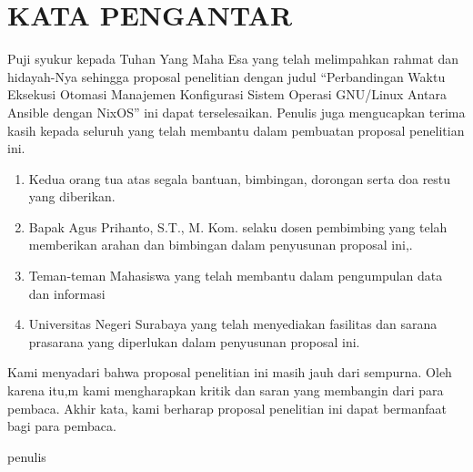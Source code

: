 \documentclass[10pt,]{report}
\begin{document}

\chapter*{KATA PENGANTAR}
  
\begin{justify}
	Puji syukur kepada Tuhan Yang Maha Esa yang telah melimpahkan rahmat dan
	hidayah-Nya sehingga proposal penelitian dengan judul “Perbandingan
	Waktu Eksekusi Otomasi Manajemen Konfigurasi Sistem Operasi GNU/Linux Antara Ansible dengan NixOS” ini
	dapat terselesaikan. Penulis juga mengucapkan terima kasih kepada seluruh
	yang telah membantu dalam pembuatan proposal penelitian ini.
	\begin{enumerate}[leftmargin=0.45cm]
		\item Kedua orang tua atas segala bantuan, bimbingan, dorongan serta doa restu yang diberikan.
		\item Bapak Agus Prihanto, S.T., M. Kom. selaku dosen pembimbing yang telah memberikan arahan dan bimbingan dalam penyusunan proposal ini,.
		\item Teman-teman Mahasiswa yang telah membantu dalam pengumpulan data dan informasi
		\item Universitas Negeri Surabaya yang telah menyediakan fasilitas dan sarana prasarana yang diperlukan dalam penyusunan proposal ini.
	\end{enumerate}
	Kami menyadari bahwa proposal penelitian ini masih jauh dari sempurna. Oleh karena itu,m kami mengharapkan kritik dan saran yang membangin dari para pembaca.
	Akhir kata, kami berharap proposal penelitian ini dapat bermanfaat bagi para pembaca.
\end{justify}
\begin{FlushRight}
	penulis
\end{FlushRight}
\newpage
\end{document}
